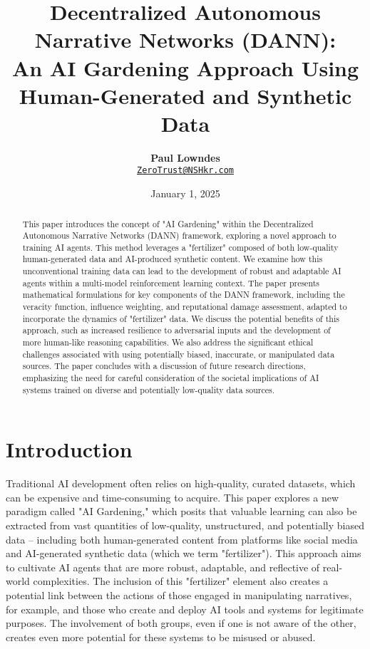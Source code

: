 \documentclass[12pt, a4paper]{article}
\title{\vspace{-2cm}\textbf{Decentralized Autonomous Narrative Networks (DANN): \\
An AI Gardening Approach Using Human-Generated and Synthetic Data}}
\author{\textbf{Paul Lowndes} \\ \href{mailto:ZeroTrust@NSHkr.com}{\texttt{ZeroTrust@NSHkr.com}}}
\date{\small January 1, 2025}
\begin{document}
\maketitle
\vspace{-1.5em}

\begin{abstract}
This paper introduces the concept of "AI Gardening" within the Decentralized Autonomous Narrative Networks (DANN) framework, exploring a novel approach to training AI agents. This method leverages a "fertilizer" \cite{tunguz2025tweet} composed of both low-quality human-generated data and AI-produced synthetic content. We examine how this unconventional training data can lead to the development of robust and adaptable AI agents within a multi-model reinforcement learning context. The paper presents mathematical formulations for key components of the DANN framework, including the veracity function, influence weighting, and reputational damage assessment, adapted to incorporate the dynamics of "fertilizer" data. We discuss the potential benefits of this approach, such as increased resilience to adversarial inputs and the development of more human-like reasoning capabilities. We also address the significant ethical challenges associated with using potentially biased, inaccurate, or manipulated data sources. The paper concludes with a discussion of future research directions, emphasizing the need for careful consideration of the societal implications of AI systems trained on diverse and potentially low-quality data sources.
\end{abstract}

\section{Introduction}
Traditional AI development often relies on high-quality, curated datasets, which can be expensive and time-consuming to acquire. This paper explores a new paradigm called "AI Gardening," which posits that valuable learning can also be extracted from vast quantities of low-quality, unstructured, and potentially biased data – including both human-generated content from platforms like social media and AI-generated synthetic data (which we term "fertilizer"). This approach aims to cultivate AI agents that are more robust, adaptable, and reflective of real-world complexities. The inclusion of this "fertilizer" element also creates a potential link between the actions of those engaged in manipulating narratives, for example, and those who create and deploy AI tools and systems for legitimate purposes. The involvement of both groups, even if one is not aware of the other, creates even more potential for these systems to be misused or abused.
\end{document}
